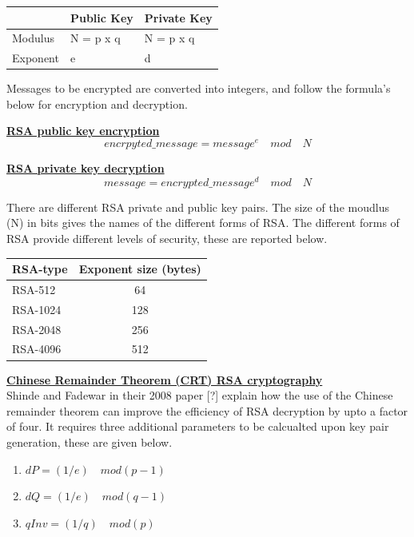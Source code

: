 \documentclass[bsc,frontabs,twoside,singlespacing,parskip,deptreport]{infthesis}     %
\begin{document}
\begin{table}[H]
\begin{tabular}{|l|l|l|}
\hline
 & Public Key & Private Key\\
\hline
Modulus & N = p x q & N = p x q\\
\hline
Exponent & e & d\\
\hline
\end{tabular}
\end{table}

Messages to be encrypted are converted into integers, and follow the formula's below for encryption and decryption.

\underline{\textbf{RSA public key encryption}}\\
$$ encrpyted\_message =  message^e  \quad mod \quad N $$

\underline{\textbf{RSA private key decryption}}\\
$$ message =  encrypted\_message^d  \quad mod \quad N $$

There are different RSA private and public key pairs. The size of the moudlus (N) in bits gives the names of the different forms of RSA. The different forms of RSA provide different levels of security, these are reported below.

\begin{table}[H]
\begin{tabular}{|l|c|}
\hline
RSA-type & Exponent size (bytes)\\
\hline
RSA-512 & 64\\
RSA-1024 & 128\\
RSA-2048 & 256\\
RSA-4096 & 512\\
\hline
\end{tabular}
\end{table}

\underline{\textbf{Chinese Remainder Theorem (CRT) RSA cryptography}}\\

Shinde and Fadewar in their 2008 paper [?] explain how the use of the Chinese remainder theorem can improve the efficiency of RSA decryption by upto a factor of four. It requires three additional parameters to be calcualted upon key pair generation, these are given below.
\begin{enumerate}
\item $dP = (1/e)\quad  mod (p-1)$
\item $dQ = (1/e) \quad mod (q-1)$
\item $qInv = (1/q) \quad mod (p)$
\end{enumerate}
\end{document}
